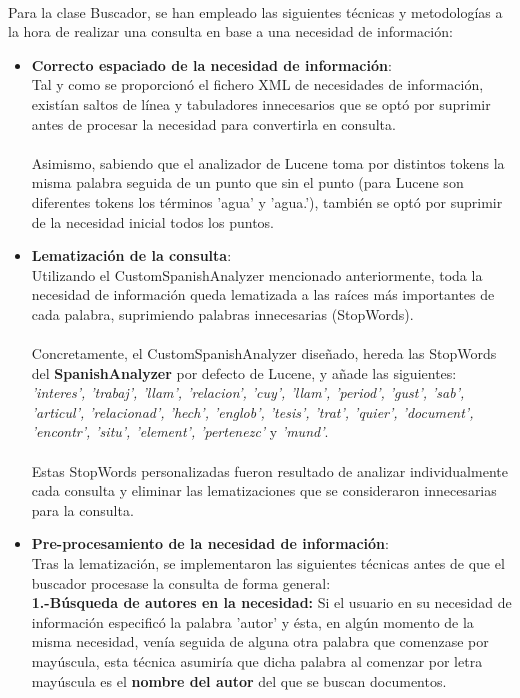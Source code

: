 \documentclass[a4paper]{article}
\begin{document}
\paragraph{}Para la clase Buscador, se han empleado las siguientes técnicas y metodologías a la hora de realizar una consulta en base a una necesidad de información:
\begin{itemize}
	\item \textbf{Correcto espaciado de la necesidad de información}:
	\\ Tal y como se proporcionó el fichero XML de necesidades de información, existían saltos de línea y tabuladores innecesarios que se optó por suprimir antes de procesar la necesidad para convertirla en consulta. 
	\paragraph{}Asimismo, sabiendo que el analizador de Lucene toma por distintos tokens la misma palabra seguida de un punto que sin el punto (para Lucene son diferentes tokens los términos 'agua' y 'agua.'), también se optó por suprimir de la necesidad inicial todos los puntos.
	\item \textbf{Lematización de la consulta}:
	\\ Utilizando el CustomSpanishAnalyzer mencionado anteriormente, toda la necesidad de información queda lematizada a las raíces más importantes de cada palabra, suprimiendo palabras innecesarias (StopWords). 
	\paragraph{}Concretamente, el CustomSpanishAnalyzer diseñado, hereda las StopWords del \textbf{SpanishAnalyzer} por defecto de Lucene, y añade las siguientes: \textit{'interes', 'trabaj', 'llam', 'relacion', 'cuy', 'llam', 'period', 'gust', 'sab', 'articul', 'relacionad', 'hech', 'englob', 'tesis', 'trat', 'quier', 'document', 'encontr', 'situ', 'element', 'pertenezc'} y \textit{'mund'}.
	\paragraph{}Estas StopWords personalizadas fueron resultado de analizar individualmente cada consulta y eliminar las lematizaciones que se consideraron innecesarias para la consulta.
	\item \textbf{Pre-procesamiento de la necesidad de información}:
	\\Tras la lematización, se implementaron las siguientes técnicas antes de que el buscador procesase la consulta de forma general:
	\\
	\newline \textbf{1.-Búsqueda de autores en la necesidad:} Si el usuario en su necesidad de información especificó la palabra 'autor' y ésta, en algún momento de la misma necesidad, venía seguida de alguna otra palabra que comenzase por mayúscula, esta técnica asumiría que dicha palabra al comenzar por letra mayúscula es el \textbf{nombre del autor} del que se buscan documentos.

\end{itemize}
\end{document}
